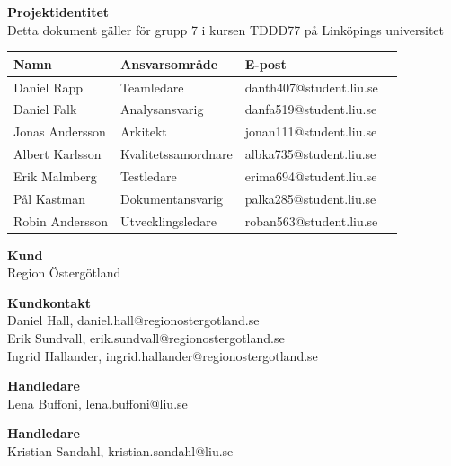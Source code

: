 \documentclass{article}
\begin{document}
\begin{flushleft}
  {\Large \textbf{Projektidentitet}}\\[0.5ex]
  {\small} Detta dokument gäller för grupp 7  i kursen TDDD77 på Linköpings universitet
  \begin{center}
    \begin{tabular}{ | l | l | p{5cm} | l |}
    \hline
    \textbf{Namn} & \textbf{Ansvarsområde} & \textbf{E-post} \\ \hline
    Daniel Rapp & Teamledare & danth407@student.liu.se \\ \hline
    Daniel Falk & Analysansvarig & danfa519@student.liu.se \\ \hline
    Jonas Andersson & Arkitekt & jonan111@student.liu.se \\ \hline
    Albert Karlsson & Kvalitetssamordnare & albka735@student.liu.se \\ \hline
    Erik Malmberg & Testledare & erima694@student.liu.se \\ \hline
    Pål Kastman & Dokumentansvarig & palka285@student.liu.se \\ \hline
    Robin Andersson & Utvecklingsledare & roban563@student.liu.se \\ \hline

    \end{tabular}
\end{center}
\end{flushleft}

\begin{flushleft}
\textbf{Kund} \\ Region Östergötland \\
\end{flushleft}
\begin{flushleft}
\textbf{Kundkontakt} \\ 
Daniel Hall, daniel.hall@regionostergotland.se \\
Erik Sundvall, erik.sundvall@regionostergotland.se \\
Ingrid Hallander, ingrid.hallander@regionostergotland.se \\
\end{flushleft}
\begin{flushleft}
\textbf{Handledare} \\ Lena Buffoni, lena.buffoni@liu.se \\
\end{flushleft}
\begin{flushleft}
\textbf{Handledare} \\ Kristian Sandahl, kristian.sandahl@liu.se \\
\end{flushleft}
\end{document}
